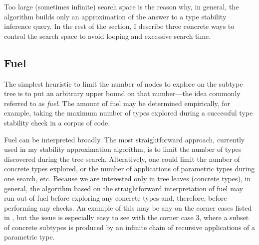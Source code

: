 Too large (sometimes infinite) search space is the reason why, in general, the
algorithm builds only an approximation of the answer to a type stability
inference query. In the rest of the section, I describe three concrete ways to
control the search space to avoid looping and excessive search time.

\subsection{Fuel}

The simplest heuristic to limit the number of nodes to explore on the subtype tree
is to put an arbitrary upper bound on that number---the idea commonly referred
to as \emph{fuel}. The amount of fuel may be determined empirically, for
example, taking the maximum number of types explored during a successful type
stability check in a corpus of code.

Fuel can be interpreted broadly.
The most straightforward approach, currently used in my stability
approximation algorithm, is to limit the number of types discovered during
the tree search.
Alteratively, one could limit the number of concrete
types explored, or the number of applications of parametric types during
one search, etc.
Because we are interested only in tree leaves (concrete types),
in general,
the algorithm based on the straightforward interpretation of fuel
may run out of fuel before exploring any concrete types and,
therefore, before performing any checks.
An example of this may be any on the
corner cases listed in , 
but the issue is especially easy to see
with the corner case 3, where a subset of concrete subtypes is produced 
by an infinite chain of recursive applications of
a parametric type.


